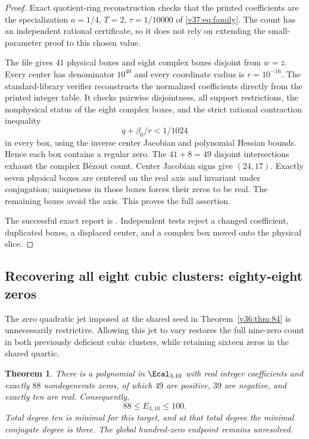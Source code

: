 \documentclass[UTF8,11pt]{ctexart}
\newtheorem{thm}{Theorem}[section]
\theoremstyle{definition}
\numberwithin{equation}{section}
\begin{document}
\begin{proof}
Exact quotient-ring reconstruction checks that the printed
coefficients are the specialization $a=1/4$, $T=2$,
$\tau=1/10000$ of \eqref{v37:eq:family}. The count has an
independent rational certificate, so it does not rely on
extending the small-parameter proof to this chosen value.

The file  gives
$41$ physical boxes and eight complex boxes disjoint from
$w=\bar z$. Every center has denominator $10^{40}$ and
every coordinate radius is $r=10^{-16}$.
The standard-library verifier 
reconstructs the normalized coefficients directly from the
printed integer table. It checks pairwise disjointness, all
support restrictions, the nonphysical status of the eight
complex boxes, and the strict rational contraction inequality
\[
                         q+\beta_0/r<1/1024
\]
in every box, using the inverse center Jacobian and polynomial
Hessian bounds. Hence each box contains a regular zero.
The $41+8=49$ disjoint intersections exhaust the complex
B\'ezout count. Center Jacobian signs give $(24,17)$.
Exactly seven physical boxes are centered on the real axis
and invariant under conjugation; uniqueness in those boxes
forces their zeros to be real. The remaining boxes avoid
the axis. This proves the full assertion.

The successful exact report is
. Independent tests
reject a changed coefficient, duplicated boxes, a displaced
center, and a complex box moved onto the physical slice.
\end{proof}


\subsection{Recovering all eight cubic clusters: eighty-eight zeros}
\label{v38:sec:88}

The zero quadratic jet imposed at the shared seed in
Theorem~\ref{v36:thm:84} is unnecessarily restrictive. Allowing
this jet to vary restores the full nine-zero count in both
previously deficient cubic clusters, while retaining sixteen
zeros in the shared quartic.

\begin{thm}\label{v38:thm:88}
There is a polynomial in $\Ecal_{3,10}$ with real integer
coefficients and exactly $88$ nondegenerate zeros, of which
$49$ are positive, $39$ are negative, and exactly ten are real.
Consequently,
\begin{equation}\label{v38:eq:bound}
                              88\le E_{3,10}\le100.
\end{equation}
Total degree ten is minimal for this target, and at that total
degree the minimal conjugate degree is three. The global
hundred-zero endpoint remains unresolved.
\end{thm}
\end{document}
